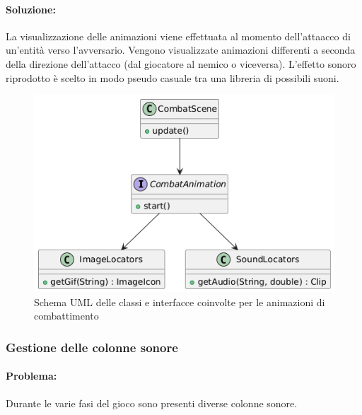 \documentclass[a4paper,12pt]{report}
\begin{document}
\paragraph{Soluzione:} La visualizzazione delle animazioni viene effettuata al momento dell'attaacco di un'entità verso l'avversario. Vengono visualizzate animazioni differenti
a seconda della direzione dell'attacco (dal giocatore al nemico o viceversa). L'effetto sonoro riprodotto è scelto in modo pseudo casuale tra una libreria di possibili suoni.
\begin{figure}[H]
	\centering{}
	\includegraphics[width=\textwidth]{img/lorenzo/combat-animations.png}
	\caption{Schema UML delle classi e interfacce coinvolte per le animazioni di combattimento}
	\label{img:template}
\end{figure}

\subsubsection{Gestione delle colonne sonore}
\paragraph{Problema:} Durante le varie fasi del gioco sono presenti diverse colonne sonore.
\end{document}

